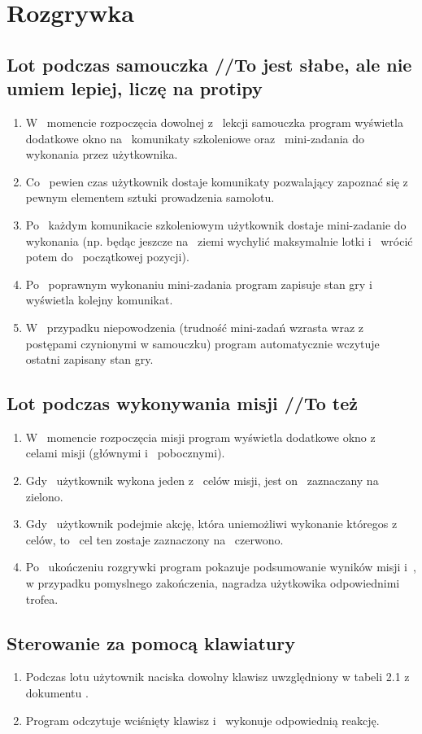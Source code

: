 \documentclass{mwrep}
\begin{document}
\chapter{Rozgrywka}
\section{Lot podczas samouczka //To jest słabe, ale nie umiem lepiej, liczę na protipy}
\begin{enumerate}
  \item W~ momencie rozpoczęcia dowolnej z~ lekcji samouczka program wyświetla dodatkowe okno na~ komunikaty szkoleniowe oraz~ mini-zadania do wykonania przez użytkownika.
  \item Co~ pewien czas użytkownik dostaje komunikaty pozwalający zapoznać się z~ pewnym elementem sztuki prowadzenia samolotu.
  \item Po~ każdym komunikacie szkoleniowym użytkownik dostaje mini-zadanie do~ wykonania (np. będąc jeszcze na~ ziemi wychylić maksymalnie lotki i~ wrócić potem do~ początkowej pozycji).
  \item Po~ poprawnym wykonaniu mini-zadania program zapisuje stan gry i~ wyświetla kolejny komunikat.
  \item W~ przypadku niepowodzenia (trudność mini-zadań wzrasta wraz z~ postępami czynionymi w samouczku) program automatycznie wczytuje ostatni zapisany stan gry.
\end{enumerate}

\section{Lot podczas wykonywania misji //To też}
\begin{enumerate}
  \item W~ momencie rozpoczęcia misji program wyświetla dodatkowe okno z~ celami misji (głównymi i~ pobocznymi).
  \item Gdy~ użytkownik wykona jeden z~ celów misji, jest on~ zaznaczany na~ zielono.
  \item Gdy~ użytkownik podejmie akcję, która uniemożliwi wykonanie któregos z~ celów, to~ cel ten zostaje zaznaczony na~ czerwono.
  \item Po~ ukończeniu rozgrywki program pokazuje podsumowanie wyników misji i~, w przypadku pomyslnego zakończenia, nagradza użytkowika odpowiednimi trofea.
\end{enumerate}

\section{Sterowanie za pomocą klawiatury}
\begin{enumerate}
  \item Podczas lotu użytownik naciska dowolny klawisz uwzględniony w tabeli 2.1 z dokumentu \cite{WYM}.
  \item Program odczytuje wciśnięty klawisz i~ wykonuje odpowiednią reakcję.
\end{enumerate}
\end{document}
